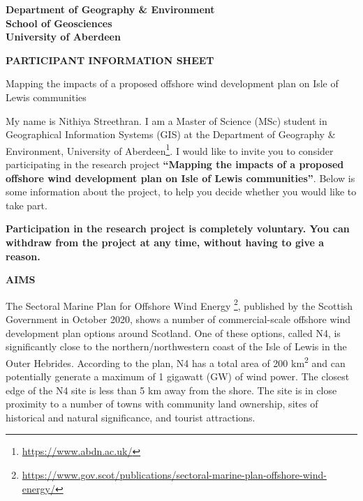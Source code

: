 {
\renewcommand\familydefault{\sfdefault}
\normalfont
\setlength{\parindent}{0pt}
\singlespacing

\begin{flushright}
\footnotesize
\bfseries
Department of Geography \& Environment \\
School of Geosciences \\
University of Aberdeen
\end{flushright}

\vspace{30pt}
\begin{center}
\textbf{\MakeUppercase{Participant information sheet}}

Mapping the impacts of a proposed offshore wind development plan on Isle of
Lewis communities
\end{center}

\vspace{30pt}
My name is Nithiya Streethran. I am a Master of Science (MSc) student in
Geographical Information Systems (GIS) at the Department of Geography \&
Environment, University of Aberdeen\footnote{\url{https://www.abdn.ac.uk/}}. I
would like to invite you to consider participating in the research project
\textbf{``Mapping the impacts of a proposed offshore wind development plan on
Isle of Lewis communities''}. Below is some information about the project, to
help you decide whether you would like to take part.

\textbf{Participation in the research project is completely voluntary. You can
withdraw from the project at any time, without having to give a reason.}

\vspace{30pt}
\textbf{\MakeUppercase{Aims}}

The Sectoral Marine Plan for Offshore Wind Energy%
\footnote{\url{https://www.gov.scot/publications/sectoral-marine-plan-offshore-wind-energy/}},
published by the Scottish Government in October 2020,
shows a number of commercial-scale offshore wind development plan options
around Scotland. One of these options, called N4, is significantly close to the
northern/northwestern coast of the Isle of Lewis in the Outer Hebrides.
According to the plan, N4 has a total area of 200 km\textsuperscript{2} and can
potentially generate a maximum of 1 gigawatt (GW) of wind power. The closest
edge of the N4 site is less than 5 km away from the shore. The site is in close
proximity to a number of towns with community land ownership, sites of
historical and natural significance, and tourist attractions.

}
